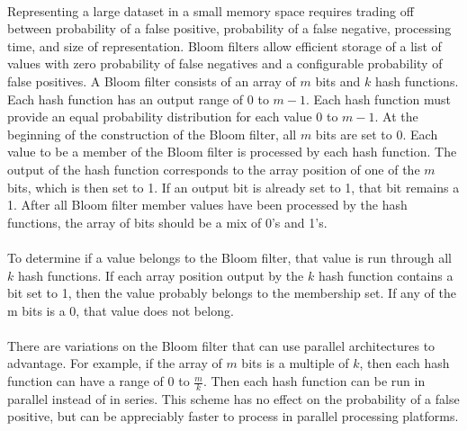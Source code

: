 			\paragraph{}Representing a large dataset in a small memory space requires trading off between probability of a false positive, probability of a false negative, processing time, and size of representation. Bloom filters allow efficient storage of a list of values with zero probability of false negatives and a configurable probability of false positives.  A Bloom filter consists of an array of $m$ bits and $k$ hash functions.  Each hash function has an output range of 0 to $m - 1$.  Each hash function must provide an equal probability distribution for each value 0 to $m-1$. At the beginning of the construction of the Bloom filter, all $m$ bits are set to 0. Each value to be a member of the Bloom filter is processed by each hash function.  The output of the hash function corresponds to the array position of one of the $m$ bits, which is then set to 1.  If an output bit is already set to 1, that bit remains a 1. After all Bloom filter member values have been processed by the hash functions, the array of bits should be a mix of 0's and 1's.  
			\paragraph{}To determine if a value belongs to the Bloom filter, that value is run through all $k$ hash functions.  If each array position output by the $k$ hash function contains a bit set to 1, then the value probably belongs to the membership set.  If any of the m bits is a 0, that value does not belong.
			\paragraph{} There are variations on the Bloom filter that can use parallel architectures to advantage.  For example, if the array of $m$ bits is a multiple of $k$, then each hash function can have a range of 0 to $\frac{m}{k}$.  Then each hash function can be run in parallel instead of in series.  This scheme has no effect on the probability of a false positive, but can be appreciably faster to process in parallel processing platforms.
